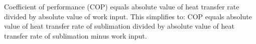 Coefficient of performance (COP) equals absolute value of heat transfer rate divided by absolute value of work input.  
This simplifies to:  
COP equals absolute value of heat transfer rate of sublimation divided by absolute value of heat transfer rate of sublimation minus work input.